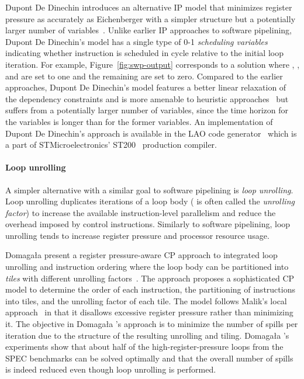 \documentclass[acmsmall,authorversion,nonacm]{acmart}
\newcommand{\var}[2]{}
\begin{document}
Dupont De Dinechin introduces an alternative IP model that minimizes
register pressure as accurately as Eichenberger \etal{} with a simpler
structure but a potentially larger number of
variables~\cite{DeDinechin2004}.
Unlike earlier IP approaches to software pipelining, Dupont De
Dinechin's model has a single type of 0-1 \emph{scheduling variables}
\var{x}{i,k} indicating whether instruction  is scheduled in cycle
 relative to the initial loop iteration.
For example, Figure~\ref{fig:swp-output} corresponds to a solution
where \var{x}{\InstrLoad{},0}, \var{x}{\InstrAdd{},2}, and
\var{x}{\InstrInc{},1} are set to one and the remaining \var{x}{i,k}
are set to zero.
Compared to the earlier approaches, Dupont De Dinechin's model
features a better linear relaxation of the dependency constraints and
is more amenable to heuristic
approaches~\cite{Blachot2006,DeDinechin2007} but suffers from a
potentially larger number of variables, since the time horizon for the
 variables is longer than for the former  variables.
An implementation of Dupont De Dinechin's approach is available in the
LAO code generator~\cite{DeDinechin2000} which is a part of
STMicroelectronics' ST200~\cite{Faraboschi2000} production compiler.

\paragraph{Loop unrolling}

A simpler alternative with a similar goal to software pipelining is
\emph{loop unrolling}.
Loop unrolling duplicates  iterations of a loop body ( is often
called the \emph{unrolling factor}) to increase the available
instruction-level parallelism and reduce the overhead imposed by
control instructions.
Similarly to software pipelining, loop unrolling tends to increase
register pressure and processor resource usage.

Domaga\l{}a \etal{} present a register pressure-aware CP approach to
integrated loop unrolling and instruction ordering where the loop body
can be partitioned into \emph{tiles} with different unrolling
factors~\cite{Domagala2016}.
The approach proposes a sophisticated CP model to determine the order
of each instruction, the partitioning of instructions into tiles, and
the unrolling factor of each tile.
The model follows Malik's local approach~\cite{Malik2008c} in that it
disallows excessive register pressure rather than minimizing it.
The objective in Domaga\l{}a \etal{}'s approach is to minimize the
number of spills per iteration due to the structure of the resulting
unrolling and tiling.
Domaga\l{}a \etal{}'s experiments show that about half of the
high-register-pressure loops from the SPEC benchmarks can be solved
optimally and that the overall number of spills is indeed reduced even
though loop unrolling is performed.
\end{document}
